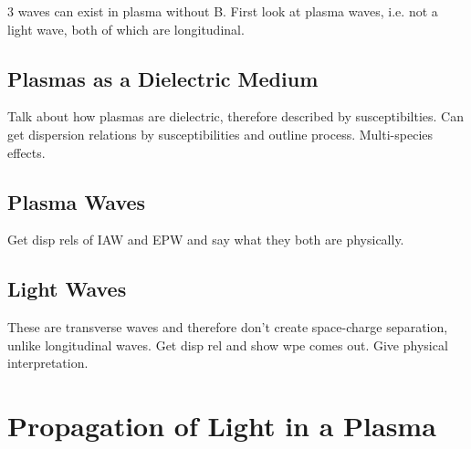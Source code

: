 3 waves can exist in plasma without B.
First look at plasma waves, i.e. not a light wave, both of which are longitudinal.

\subsection{Plasmas as a Dielectric Medium}%
\label{sec:theory_dielectric}

Talk about how plasmas are dielectric, therefore described by susceptibilties.
Can get dispersion relations by susceptibilities and outline process.
Multi-species effects.

\subsection{Plasma Waves}%
\label{sec:theory_longwaves}

Get disp rels of IAW and EPW and say what they both are physically.

\subsection{Light Waves}%
\label{sec:theory_transwaves}

These are transverse waves and therefore don't create space-charge separation, unlike longitudinal waves.
Get disp rel and show wpe comes out.
Give physical interpretation.

\section{Propagation of Light in a Plasma}%
\label{sec:theory_propagation}

